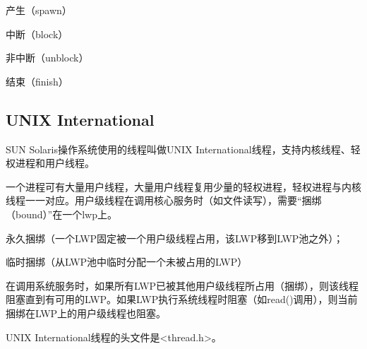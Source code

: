 \begin{compactitem}
\item 产生（spawn）
\item 中断（block）
\item 非中断（unblock）
\item 结束（finish）
\end{compactitem}

\subsection{UNIX  International}

SUN Solaris操作系统使用的线程叫做UNIX International线程，支持内核线程、轻权进程和用户线程。

一个进程可有大量用户线程，大量用户线程复用少量的轻权进程，轻权进程与内核线程一一对应。用户级线程在调用核心服务时（如文件读写），需要“捆绑（bound）”在一个lwp上。

\begin{compactitem}
\item 永久捆绑（一个LWP固定被一个用户级线程占用，该LWP移到LWP池之外）；
\item 临时捆绑（从LWP池中临时分配一个未被占用的LWP）
\end{compactitem}

在调用系统服务时，如果所有LWP已被其他用户级线程所占用（捆绑），则该线程阻塞直到有可用的LWP。如果LWP执行系统线程时阻塞（如read()调用），则当前捆绑在LWP上的用户级线程也阻塞。

UNIX International线程的头文件是<thread.h>。

